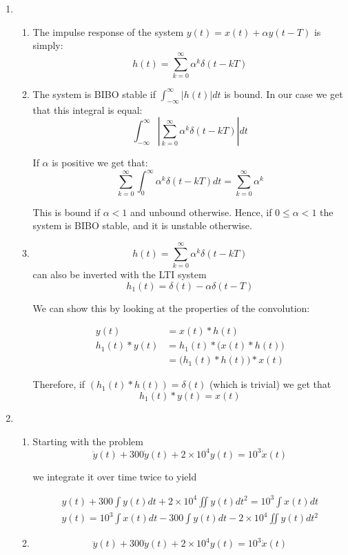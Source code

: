 \documentclass[]{article}
\date{}
\begin{document}
\begin{enumerate}
\def\labelenumi{\arabic{enumi})}
\item
  \begin{enumerate}
  \def\labelenumii{\alph{enumii}.}
  \item
    The impulse response of the system \(y(t) = x(t) + \alpha y(t - T)\)
    is simply: \[
        h(t) = \sum_{k = 0}^\infty \alpha^k \delta(t - kT)
    \]
  \item
    The system is BIBO stable if \(\int_{-\infty}^\infty |h(t)|dt\) is
    bound. In our case we get that this integral is equal: \[
        \int_{-\infty}^\infty \left| 
            \sum_{k = 0}^\infty \alpha^k \delta(t - kT)
        \right| dt
    \]

    If \(\alpha\) is positive we get that: \[
        \sum_{k = 0}^\infty \int_0^\infty \alpha^k \delta(t - kT)dt  = 
            \sum_{k = 0}^\infty \alpha^k
    \]

    This is bound if \(\alpha < 1\) and unbound otherwise. Hence, if
    \(0 \leq \alpha < 1\) the system is BIBO stable, and it is unstable
    otherwise.
  \item
    \[
        h(t) = \sum_{k = 0}^\infty \alpha^k \delta(t - kT)
    \] can also be inverted with the LTI system \[
        \boxed{h_1(t) = \delta(t) - \alpha \delta(t - T)}
    \]

    We can show this by looking at the properties of the convolution:

    \begin{align*}
        y(t) &= x(t) * h(t) \\
        h_1(t) * y(t) &= h_1(t) * \Big( x(t) * h(t) \Big) \\
        &= \Big( h_1(t) * h(t) \Big) * x(t)
    \end{align*}

    Therefore, if \((h_1(t) * h(t)) = \delta(t)\) (which is trivial) we
    get that \[
        h_1(t) * y(t)  = x(t)
    \]
  \end{enumerate}
\item
  \begin{enumerate}
  \def\labelenumii{\alph{enumii}.}
  \item
    Starting with the problem \[
        \ddot{y}(t) + 300\dot{y}(t) + 2 \times 10^4 y(t) = 10^3 \dot{x}(t)
    \]

    we integrate it over time twice to yield

    \begin{align*}
        y(t) + 300\int y(t) dt + 2 \times 10^4 \iint y(t) dt^2 = 10^3 \int x(t) dt \\
        y(t) = 10^3 \int x(t) dt - 300\int y(t) dt - 2 \times 10^4 \iint y(t) dt^2
    \end{align*}
  \item
    \[
        \ddot{y}(t) + 300\dot{y}(t) + 2 \times 10^4 y(t) = 10^3 \dot{x}(t)
    \]


\end{enumerate}
\end{enumerate}
\end{document}
